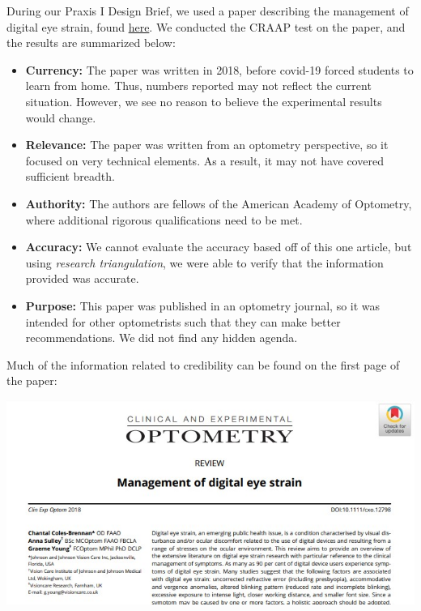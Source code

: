 \documentclass{beamer}
\begin{document}
{  During our Praxis I Design Brief, we used a paper describing the management of digital eye strain, found \href{https://www.tandfonline.com/doi/full/10.1111/cxo.12798}{here}. We conducted the CRAAP test on the paper, and the results are summarized below:
  \begin{itemize}
      \item \textbf{Currency:} The paper was written in 2018, before covid-19 forced students to learn from home. Thus, numbers reported may not reflect the current situation. However, we see no reason to believe the experimental results would change.
      \item \textbf{Relevance:} The paper was written from an optometry perspective, so it focused on very technical elements. As a result, it may not have covered sufficient breadth.
      \item \textbf{Authority:} The authors are fellows of the American Academy of Optometry, where additional rigorous qualifications need to be met.
      \item \textbf{Accuracy:} We cannot evaluate the accuracy based off of this one article, but using \textit{research triangulation}, we were able to verify that the information provided was accurate.
      \item \textbf{Purpose:} This paper was published in an optometry journal, so it was intended for other optometrists such that they can make better recommendations. We did not find any hidden agenda.
  \end{itemize}
  Much of the information related to credibility can be found on the first page of the paper\cite{Colesbrennan2019}:
  \begin{center}
      \includegraphics[width=0.8\linewidth]{handbook/craap.jpg}
  \end{center}
}
\end{document}
